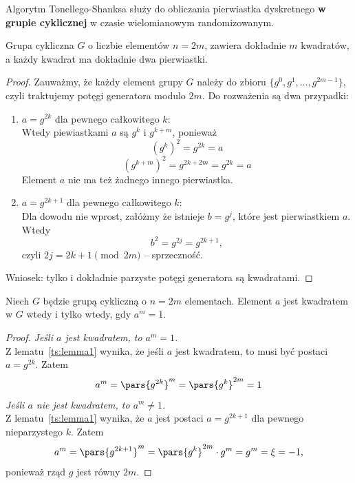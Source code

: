 Algorytm Tonellego-Shanksa służy do obliczania pierwiastka dyskretnego \textbf{w grupie cyklicznej} w czasie wielomianowym randomizowanym.

\begin{lemma}\label{ts:lemma1}
	Grupa cykliczna \( G \) o liczbie elementów \(n = 2m \), zawiera dokładnie \( m \) kwadratów, a każdy kwadrat ma dokładnie dwa pierwiastki.
\end{lemma}
\begin{proof}
	Zauważmy, że każdy element grupy \( G \) należy do zbioru \( \{g^0, g^1, \dots, g^{2m-1}\} \), czyli traktujemy potęgi generatora modulo \( 2m \). Do rozważenia są dwa przypadki:
	\begin{enumerate}
		\item \( a = g^{2k} \) dla pewnego całkowitego \( k \): \\
		      Wtedy piewiastkami \( a \) są \( g^k \) i \( g^{k+m} \), ponieważ
		      \[
			      (g^k)^2 = g^{2k} = a
		      \]
		      \[
			      (g^{k+m})^2 = g^{2k+2m} = g^{2k} = a
		      \]
		      Element \( a \) nie ma też żadnego innego pierwiastka.
		\item \( a = g^{2k+1} \) dla pewnego całkowitego \( k \): \\
		      Dla dowodu nie wprost, załóżmy że istnieje \( b = g^j \), które jest pierwiastkiem \( a \). Wtedy
		      \[
			      b^2 = g^{2j} = g^{2k + 1},
		      \]
		      czyli \( 2j = 2k + 1 \pmod{2m} \) -- sprzeczność.
	\end{enumerate}
	Wniosek: tylko i dokładnie parzyste potęgi generatora są kwadratami.
\end{proof}

\begin{lemma}\label{A11:lemma2}
	Niech \( G \) będzie grupą cykliczną o \( n = 2m \) elementach. Element \( a \) jest kwadratem w \( G \) wtedy i tylko wtedy, gdy \( a^m = 1 \).
\end{lemma}
\begin{proof}
	\textit{Jeśli \( a \) jest kwadratem, to \( a^m = 1\).} \\
	Z lematu~\ref{ts:lemma1} wynika, że jeśli \( a \) jest kwadratem, to musi być postaci \( a = g^{2k} \). Zatem
	\[
		a^m = \pars{g^{2k}}^m = \pars{g^{k}}^{2m} = 1
	\]
	\textit{Jeśli \( a \) nie jest kwadratem, to \( a^m \neq 1\).} \\
	Z lematu~\ref{ts:lemma1} wynika, że \( a \) jest postaci \( a = g^{2k+1} \) dla pewnego nieparzystego \( k \). Zatem
	\[
		a^m = \pars{g^{2k+1}}^m = \pars{g^k}^{2m} \cdot g^m = g^m = \xi = -1,
	\]
	ponieważ rząd \( g \) jest równy \( 2m \).
\end{proof}

